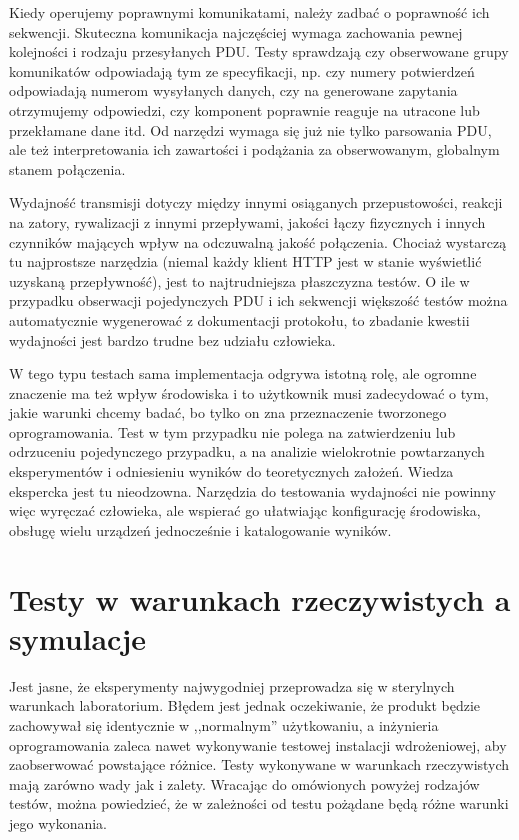 \documentclass[00-praca-magisterska.tex]{subfiles}
\begin{document}
Kiedy operujemy poprawnymi komunikatami, należy zadbać o poprawność ich
sekwencji. Skuteczna komunikacja najczęściej wymaga zachowania pewnej
kolejności i rodzaju przesyłanych PDU. Testy sprawdzają czy obserwowane grupy
komunikatów odpowiadają tym ze specyfikacji, np. czy numery potwierdzeń
odpowiadają numerom wysyłanych danych, czy na generowane zapytania otrzymujemy
odpowiedzi, czy komponent poprawnie reaguje na utracone lub przekłamane dane
itd. Od narzędzi wymaga się już nie tylko parsowania PDU, ale też
interpretowania ich zawartości i podążania za obserwowanym, globalnym stanem
połączenia.

Wydajność transmisji dotyczy między innymi osiąganych przepustowości, reakcji
na zatory, rywalizacji z innymi przepływami, jakości łączy fizycznych i innych
czynników mających wpływ na odczuwalną jakość połączenia. Chociaż wystarczą tu
najprostsze narzędzia (niemal każdy klient HTTP jest w stanie wyświetlić
uzyskaną przepływność), jest to najtrudniejsza płaszczyzna testów. O ile w
przypadku obserwacji pojedynczych PDU i ich sekwencji większość testów można
automatycznie wygenerować z dokumentacji protokołu, to zbadanie kwestii
wydajności jest bardzo trudne bez udziału człowieka.

W tego typu testach sama implementacja odgrywa istotną rolę, ale ogromne
znaczenie ma też wpływ środowiska i to użytkownik musi zadecydować o tym, jakie
warunki chcemy badać, bo tylko on zna przeznaczenie tworzonego oprogramowania.
Test w tym przypadku nie polega na zatwierdzeniu lub odrzuceniu pojedynczego
przypadku, a na analizie wielokrotnie powtarzanych eksperymentów i odniesieniu
wyników do teoretycznych założeń. Wiedza ekspercka jest tu nieodzowna.
Narzędzia do testowania wydajności nie powinny więc wyręczać człowieka, ale
wspierać go ułatwiając konfigurację środowiska, obsługę wielu urządzeń
jednocześnie i katalogowanie wyników.

\section{Testy w warunkach rzeczywistych a symulacje}
\label{testy-w-warunkach-rzeczywistych-a-symulacje}

Jest jasne, że eksperymenty najwygodniej przeprowadza się w sterylnych
warunkach laboratorium. Błędem jest jednak oczekiwanie, że produkt będzie
zachowywał się identycznie w ,,normalnym'' użytkowaniu, a inżynieria oprogramowania
zaleca nawet wykonywanie testowej instalacji wdrożeniowej, aby zaobserwować
powstające różnice. Testy wykonywane w warunkach rzeczywistych mają zarówno
wady jak i zalety.  Wracając do omówionych powyżej rodzajów testów, można
powiedzieć, że w zależności od testu pożądane będą różne warunki jego
wykonania.
\end{document}
